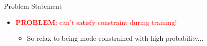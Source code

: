 \documentclass[final,11pt]{beamer}
\newlength{\colwidth}
\newcommand{\E}{\mathbb{E}}    %
\renewcommand{\mid}{\,|\,}
\DeclareMathOperator{\E}{\mathbb{E}}
\newcommand{\modeInd}{\ensuremath{k}}
\newcommand{\ModeInd}{\ensuremath{\MakeUppercase{\modeInd}}}
\newcommand{\mode}[1]{\ensuremath{#1_{\modeInd}}}
\newcommand{\state}{\ensuremath{\mathbf{x}}}
\newcommand{\control}{\ensuremath{\mathbf{u}}}
\newcommand{\modeVar}{\ensuremath{\alpha}}
\newcommand{\timeInd}{\ensuremath{t}}
\newcommand{\TimeInd}{\ensuremath{\MakeUppercase{\timeInd}}}
\newcommand{\dynamicsFunc}{\ensuremath{f}}
\newcommand{\desiredMode}{\ensuremath{\modeInd^{*}}}
\newcommand{\stateDomain}{\ensuremath{\mathcal{S}}}
\newcommand{\controlDomain}{\ensuremath{\mathcal{A}}}
\renewcommand{\state}{\ensuremath{\mathbf{s}}}
\renewcommand{\mode}[1]{\ensuremath{#1_{\modeInd}}}
\renewcommand{\control}{\ensuremath{\mathbf{a}}}
\newcommand{\rewardFunc}{\ensuremath{r}}
\begin{document}
\begin{frame}[t]
\begin{columns}[t]
\begin{column}{\colwidth}
\begin{block}{Problem Statement}
\begin{itemize}
      whilst remaining in the desired dynamic mode's $\desiredMode$ state domain $\stateDomain_{\desiredMode} = \{ \state \in \stateDomain \mid \modeVar(\state) = \desiredMode\}$:
        \begin{align} \label{eq-main-problem}
        \pi^{*}=\arg \max_{\pi \in \Pi} J(\pi, \dynamicsFunc) \quad \text{s.t. } &\color{black}{\underbrace{\modeVar(\state_{\timeInd}) = \desiredMode \quad \forall \timeInd \in \{0, \ldots, \TimeInd\}}_{\text{mode constraint}}},
        \end{align}
      \item \textcolor{red}{\textbf{PROBLEM}: can't satisfy constraint during training!}
      \begin{itemize}
        \item So relax to being mode-constrained with high probability...
      \end{itemize}
    \end{itemize}




\end{block}
\end{column}
\end{columns}
\end{frame}
\end{document}
